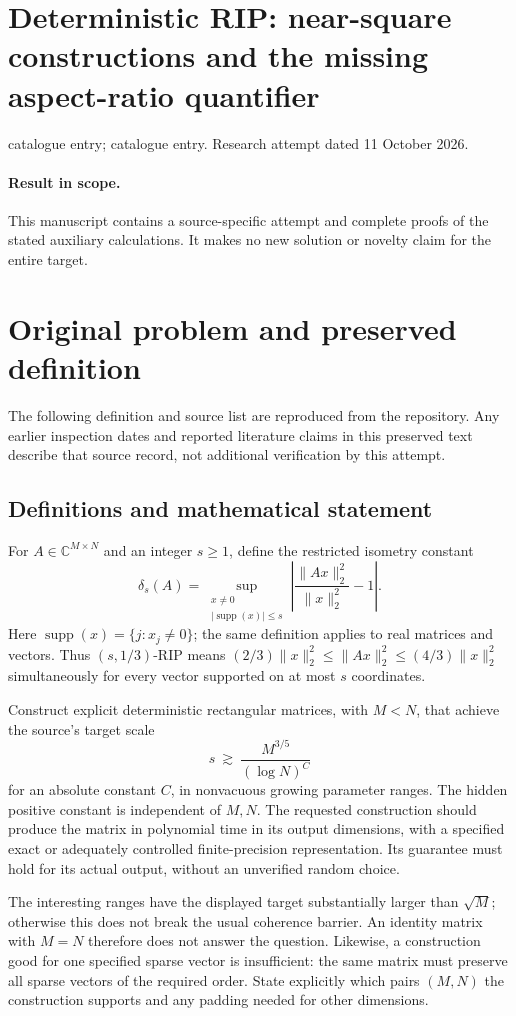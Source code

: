 \documentclass[11pt]{article}
\begin{document}
\section*{Deterministic RIP: near-square constructions and the missing aspect-ratio quantifier}
\noindent catalogue entry; catalogue entry. Research attempt dated 11 October 2026.
\paragraph{Result in scope.}This manuscript contains a source-specific attempt and complete proofs of the stated auxiliary calculations. It makes no new solution or novelty claim for the entire target.
\section{Original problem and preserved definition}
The following definition and source list are reproduced from the repository. Any earlier inspection dates and reported literature claims in this preserved text describe that source record, not additional verification by this attempt.
\subsection{Definitions and mathematical statement}
For $A\in\mathbb C^{M\times N}$ and an integer $s\ge1$, define the
restricted isometry constant
\[
 \delta_s(A)=\sup_{\substack{x\ne0\\|\operatorname{supp}(x)|\le s}}
             \left|\frac{\|Ax\|_2^2}{\|x\|_2^2}-1\right|.
\]
Here $\operatorname{supp}(x)=\{j:x_j\ne0\}$; the same definition applies
to real matrices and vectors. Thus $(s,1/3)$-RIP means
$(2/3)\|x\|_2^2\le\|Ax\|_2^2\le(4/3)\|x\|_2^2$ simultaneously
for every vector supported on at most $s$ coordinates.

Construct explicit deterministic rectangular matrices, with $M<N$,
that achieve the source's target scale
\[
                  s\ \gtrsim\ \frac{M^{3/5}}{(\log N)^C}
\]
for an absolute constant $C$, in nonvacuous growing parameter ranges.
The hidden positive constant is independent of $M,N$. The requested
construction should produce the matrix in polynomial time in its
output dimensions, with a specified exact or adequately controlled
finite-precision representation. Its guarantee must hold for its
actual output, without an unverified random choice.

The interesting ranges have the displayed target substantially larger
than $\sqrt M$; otherwise this does not break the usual coherence
barrier. An identity matrix with $M=N$ therefore does not answer the
question. Likewise, a construction good for one specified sparse
vector is insufficient: the same matrix must preserve all sparse
vectors of the required order. State explicitly which pairs $(M,N)$
the construction supports and any padding needed for other dimensions.
\end{document}
